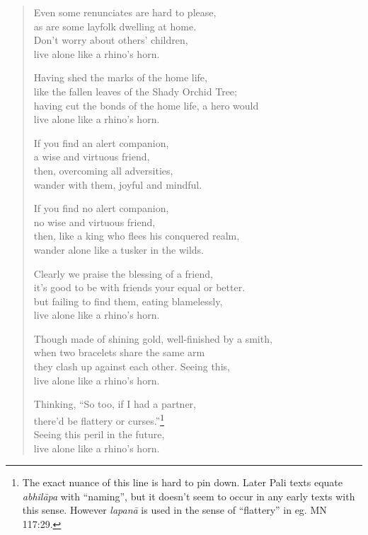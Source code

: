 \documentclass[12pt,openany]{book}%
\begin{document}
\begin{verse}
Even some renunciates are hard to please, \\
as are some layfolk dwelling at home. \\
Don’t worry about others’ children, \\
live alone like a rhino’s horn. 

Having shed the marks of the home life, \\
like the fallen leaves of the Shady Orchid Tree; \\
having cut the bonds of the home life, a hero would \\
live alone like a rhino’s horn. 

If you find an alert companion, \\
a wise and virtuous friend, \\
then, overcoming all adversities, \\
wander with them, joyful and mindful. 

If you find no alert companion, \\
no wise and virtuous friend, \\
then, like a king who flees his conquered realm, \\
wander alone like a tusker in the wilds. 

Clearly we praise the blessing of a friend, \\
it’s good to be with friends your equal or better. \\
but failing to find them, eating blamelessly, \\
live alone like a rhino’s horn. 

Though made of shining gold, well-finished by a smith, \\
when two bracelets share the same arm \\
they clash up against each other. Seeing this, \\
live alone like a rhino’s horn. 

Thinking, “So too, if I had a partner, \\
there’d be flattery or curses.”\footnote{The exact nuance of this line is hard to pin down. Later Pali texts equate \textit{\textsanskrit{abhilāpa}} with “naming”, but it doesn’t seem to occur in any early texts with this sense. However \textit{\textsanskrit{lapanā}} is used in the sense of “flattery” in eg. MN 117:29. } \\
Seeing this peril in the future, \\
live alone like a rhino’s horn. 


\end{verse}
\end{document}
